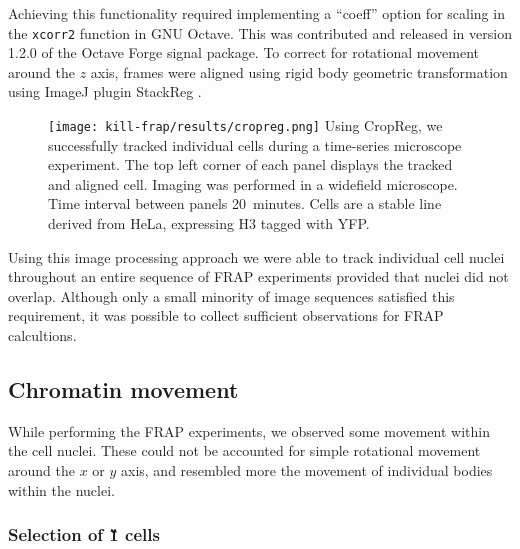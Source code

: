       Achieving this functionality required implementing a ``coeff'' option 
	  for scaling in the \texttt{xcorr2} function in GNU Octave.
	  This was contributed and released in version 1.2.0 of the Octave Forge signal package.
      To correct for rotational movement around the $z$ axis, 
      frames were aligned using rigid body geometric transformation using ImageJ plugin StackReg \citep{stackreg}.

      \begin{figure}
        \centering
        \texttt{[image: kill-frap/results/cropreg.png]}
          {
            Using CropReg, we successfully tracked individual cells during
            a time-series microscope experiment. The top left corner of each
            panel displays the tracked and aligned cell. Imaging was performed
            in a widefield microscope. Time interval between panels 20~minutes.
            Cells are a stable line derived from HeLa, expressing H3 tagged
            with YFP.
          }
        \label{fig:kill-frap:cropreg}
      \end{figure}

      Using this image processing approach we were able to track individual cell nuclei 
	  throughout an entire sequence of FRAP experiments  provided
      that nuclei did not overlap. 
	  Although only a small minority of image sequences satisfied this requirement, 
	  it was possible to collect sufficient observations for FRAP calcultions.

  \subsection{Chromatin movement}

    While performing the FRAP experiments, we observed some movement
    within the cell nuclei. These could not be accounted for simple rotational
    movement around the $x$ or $y$ axis, and resembled more the movement
    of individual bodies within the nuclei.

    \subsubsection{Selection of \G1{} cells}


